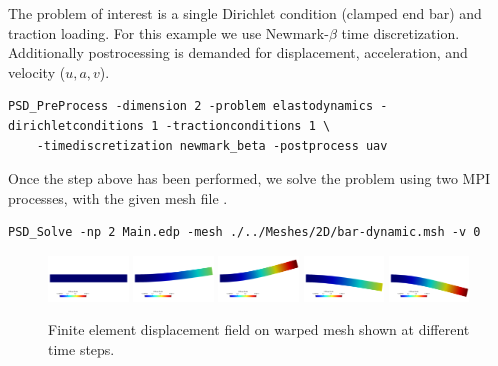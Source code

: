 {{The problem of interest is a single Dirichlet condition (clamped end bar) and traction loading. For this example we use Newmark-$\beta$ time discretization. Additionally postrocessing is demanded for displacement, acceleration, and velocity ($u,a,v$). 

\begin{lstlisting}[style=BashInputStyle]
	PSD_PreProcess -dimension 2 -problem elastodynamics -dirichletconditions 1 -tractionconditions 1 \
	-timediscretization newmark_beta -postprocess uav
\end{lstlisting}

Once the step above has been performed, we solve the problem using two MPI processes, with the given mesh file . 

\begin{lstlisting}[style=BashInputStyle]
	PSD_Solve -np 2 Main.edp -mesh ./../Meshes/2D/bar-dynamic.msh -v 0
\end{lstlisting}

\begin{figure}[h!]
	\includegraphics[width=0.19\textwidth]{./Images/ed-u0.png}
	\includegraphics[width=0.19\textwidth]{./Images/ed-u2.png}
	\includegraphics[width=0.19\textwidth]{./Images/ed-u3.png}
	\includegraphics[width=0.19\textwidth]{./Images/ed-u4.png}
	\includegraphics[width=0.19\textwidth]{./Images/ed-u5.png}
	\caption{Finite element displacement field on warped mesh shown at different time steps. \label{bar-ed}}
\end{figure}

}}

